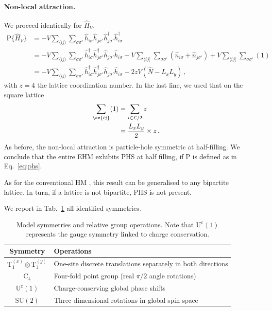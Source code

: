 \begin{tabproof}
	\paragraph{Non-local attraction.}
	
	We proceed identically for $\hat H_V$,
	\[
	\begin{aligned}
		\mathrm{P} \lbrace \hat H_V \rbrace &= - V \sum_{\langle ij \rangle} \sum_{\sigma \sigma'} \hat h_{i\sigma} \hat h_{j\sigma'} \hat h_{j\sigma'}^\dagger \hat h_{i\sigma}^\dagger \\
		&= - V \sum_{\langle ij \rangle} \sum_{\sigma \sigma'} \hat h_{i\sigma}^\dagger \hat h_{j\sigma'}^\dagger \hat h_{j\sigma'} \hat h_{i\sigma} - V \sum_{\langle ij \rangle} \sum_{\sigma \sigma'} \left(
			\hat n_{i\sigma} + \hat n_{j\sigma'}
		\right) + V \sum_{\langle ij \rangle} \sum_{\sigma \sigma'} (1) \\
		&= - V \sum_{\langle ij \rangle} \sum_{\sigma \sigma'} \hat h_{i\sigma}^\dagger \hat h_{j\sigma'}^\dagger \hat h_{j\sigma'} \hat h_{i\sigma} - 2zV (\hat N - L_x L_y) \, ,
	\end{aligned}
	\]
	with $z=4$ the lattice coordination number. In the last line, we used that on the square lattice
	\begin{align}
		\sum_{\ev{ij}} (1) &= \sum_{i\in\mathcal{L}/2} z \nonumber \\
		&= \frac{L_x L_y}{2} \times z \, . \label{eq:square-NN-ghost-sum}
	\end{align}
	As before, the non-local attraction is particle-hole symmetric at half-filling. We conclude that the entire EHM exhibits PHS at half filling, if $\mathrm{P}$ is defined as in Eq.~\eqref{eq:phs}.
\end{tabproof}
%
As for the conventional HM \cite{arovas2022hubbard}, this result can be generalised to any bipartite lattice. In turn, if a lattice is not bipartite, PHS is not present. 

We report in Tab.~\ref{tab:symmetry-groups} all identified symmetries.

\begin{table}
	\centering
	\begin{tabular}{c l}
		\textbf{Symmetry} & \textbf{Operations} \\
		\midrule
		$\mathrm{T}_1^{(x)} \otimes \mathrm{T}_1^{(y)}$ & One-site discrete translations separately in both directions \\
		$\mathrm{C}_4$ & Four-fold point group (real $\pi/2$ angle rotations) \\
		$\mathrm{U}^\mathrm{c}(1)$ & Charge-conserving global phase shifts \\
		$\mathrm{SU}(2)$ & Three-dimensional rotations in global spin space \\
		\midrule
	\end{tabular}
	\caption{Model symmetries and relative group operations. Note that $\mathrm{U}^\mathrm{c}(1)$ represents the gauge symmetry linked to charge conservation.}
	\label{tab:symmetry-groups}
\end{table}

